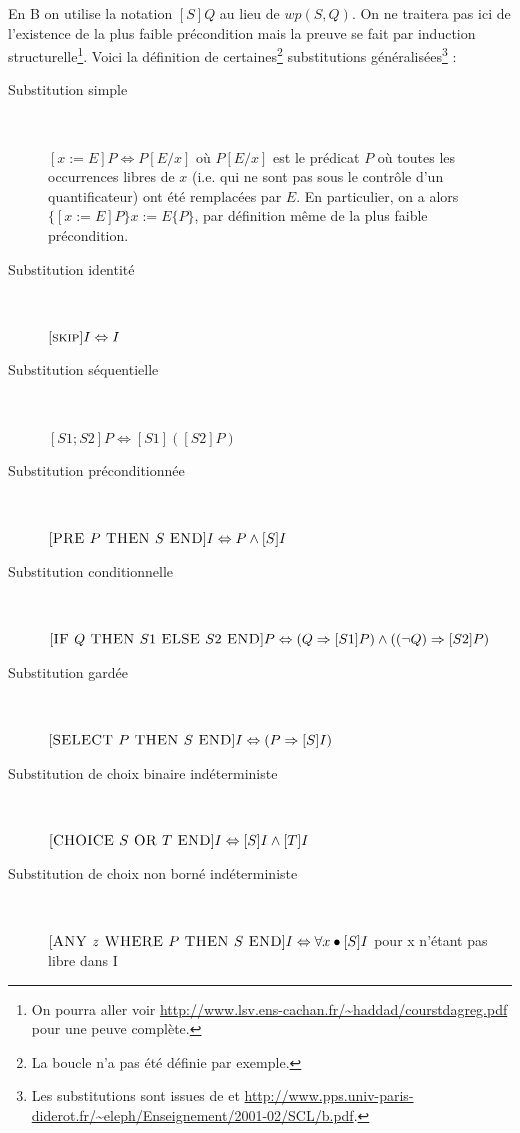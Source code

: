 \documentclass[10pt,a4paper]{article}
\begin{document}
En B on utilise la notation $[S]Q$ au lieu de $wp(S, Q)$. On ne traitera pas ici de l'existence de la plus faible précondition mais la preuve se fait par induction structurelle\footnote{On pourra aller voir \url{http://www.lsv.ens-cachan.fr/~haddad/courstdagreg.pdf} pour une peuve complète.}. Voici la définition de certaines\footnote{La boucle n'a pas été définie par exemple.} substitutions généralisées\footnote{Les substitutions sont issues de \cite{habrias2006specifications} et \url{http://www.pps.univ-paris-diderot.fr/~eleph/Enseignement/2001-02/SCL/b.pdf}.} :
\begin{description}
\item[Substitution simple] ~

$[ x := E ]P \Leftrightarrow P[E/x]$ où $P[E/x]$ est le prédicat $P$ où toutes les occurrences libres de $x$ (i.e. qui ne sont pas sous le contrôle d'un quantificateur) ont été remplacées par $E$. En particulier, on a alors $\{ [x := E ]P \} x := E\{ P\}$, par définition même de la plus faible précondition.
\item[Substitution identité]  ~

$[\textsc{skip}]I \Leftrightarrow I$
\item[Substitution séquentielle]  ~

$[S1;S2]P 	\Leftrightarrow [S1]([S2]P)$
\item[Substitution préconditionnée]  ~

$[\textsc{PRE } P \textsc{ THEN } S \textsc{ END}]I \Leftrightarrow P \wedge [S]I$
\item[Substitution conditionnelle]  ~

$[\textsc{IF } Q \textsc{ THEN } S1 \textsc{ ELSE } S2 \textsc{ END}]P \Leftrightarrow (Q \Rightarrow [S1]P) \wedge( (\lnot Q)\Rightarrow [S2]P)$
\item[Substitution gardée]  ~

$[\textsc{SELECT } P \textsc{ THEN } S \textsc{ END}]I \Leftrightarrow \left( P \Rightarrow [S]I \right)$
\item[Substitution de choix binaire indéterministe]  ~

$[\textsc{CHOICE } S \textsc{ OR } T \textsc{ END}]I \Leftrightarrow [S]I \wedge [T ]I$
\item[Substitution de choix non borné indéterministe] ~

$[\textsc{ANY } z \textsc{ WHERE } P \textsc{ THEN } S \textsc{ END}]I \Leftrightarrow \forall x \bullet [S]I$ pour x n'étant pas libre dans I
\end{description}
\end{document}
